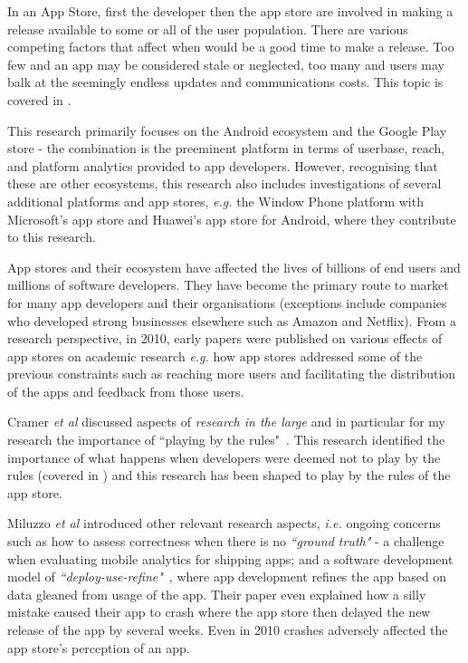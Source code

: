 In an App Store, first the developer then the app store are involved in making a release available to some or all of the user population. There are various competing factors that affect when would be a good time to make a release. Too few and an app may be considered stale or neglected, too many and users may balk at the seemingly endless updates and communications costs. This topic is covered in .  

This research primarily focuses on the Android ecosystem and the Google Play store - the combination is the preeminent platform in terms of userbase, reach, and platform analytics provided to app developers. However, recognising that these are other ecosystems, this research also includes investigations of several additional platforms and app stores, \emph{e.g.} the Window Phone platform with Microsoft's app store and Huawei's app store for Android, where they contribute to this research. 

App stores and their ecosystem have affected the lives of billions of end users and millions of software developers. They have become the primary route to market for many app developers and their organisations (exceptions include companies who developed strong businesses elsewhere such as Amazon and Netflix). 
From a research perspective, in 2010, early papers were published on various effects of app stores on academic research \emph{e.g.} how app stores addressed some of the previous constraints such as reaching more users and facilitating the distribution of the apps and feedback from those users. 

Cramer \emph{et al} discussed aspects of \emph{research in the large} and in particular for my research the importance of ``playing by the rules"~. This research identified the importance of what happens when developers were deemed not to play by the rules (covered in ) and this research has been shaped to play by the rules of the app store. %

Miluzzo \emph{et al} introduced other relevant research aspects, \emph{i.e.} ongoing concerns such as how to assess correctness when there is no \emph{``ground truth"} - a challenge when evaluating mobile analytics for shipping apps; and a software development model of \emph{``deploy-use-refine"}~, where app development refines the app based on data gleaned from usage of the app. Their paper even explained how a silly mistake caused their app to crash where the app store then delayed the new release of the app by several weeks. Even in 2010 crashes adversely affected the app store's perception of an app. %


